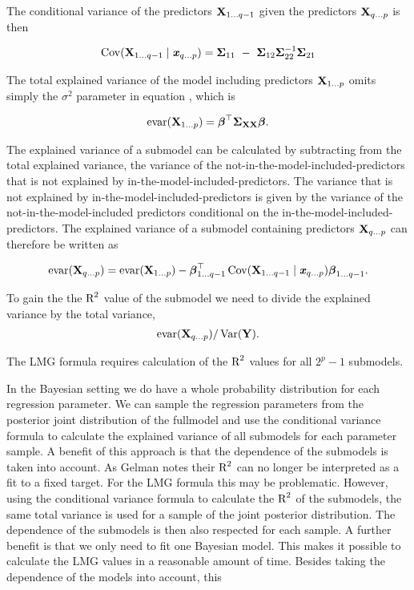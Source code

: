 \documentclass[11pt,a4paper,twoside]{book}
\begin{document}
 The conditional variance of the predictors $ {\mathbf{X}}_{1 \dots q-1} $ given the predictors  $ {\mathbf{X}}_{q \dots p} $ is then
 
          \begin{align} 
 \cov(\X_{1\dots q-1} \mid \x_{q \dots p}) = \bSigma_{11}\ -\ \bSigma_{12} \bSigma_{22}^{-1}\bSigma_{21}
       \end{align}
       
       The total explained variance of the model including predictors ${\mathbf{X}}_{1 \dots p}$ omits simply the $\sigma^2$ parameter in equation , which is

      \begin{align} 
        \text{evar}({\mathbf{X}}_{1 \dots p}) = {\boldsymbol{\beta}}^\top {\boldsymbol{\Sigma}}{}_{{\mathbf{X}} {\mathbf{X}}}  {\boldsymbol{\beta}}. 
   \end{align}

The explained variance of a submodel can be calculated by subtracting from the total explained variance, the variance of the not-in-the-model-included-predictors that is not explained by in-the-model-included-predictors. The variance that is not explained by in-the-model-included-predictors is given by the variance of the not-in-the-model-included predictors conditional on the in-the-model-included-predictors. The explained variance of a submodel containing predictors ${\mathbf{X}}_{q \dots p}$ can therefore be written as

       \begin{align} 
       \text{evar}({\mathbf{X}}_{q \dots p}) =  \text{evar}({\mathbf{X}}_{1  \dots p}) - {\boldsymbol{\beta}}^\top_{1 \dots q-1} \operatorname{Cov}({\mathbf{X}}_{1\dots {q-1}} \mid {\textbf{\textit{x}}}_{q \dots p}) {\boldsymbol{\beta}}_{1 \dots {q-1}}.
   \end{align}

To gain the the $\text{R}^2$ value of the submodel we need to divide the explained variance by the total variance,
       \begin{align} 
\text{evar}({\mathbf{X}}_{q \dots p}) / \operatorname{Var}({\mathbf{Y}}).   
\end{align}

The LMG formula requires calculation of the $\text{R}^2$ values for all $2^p-1$ submodels. 

In the Bayesian setting we do have a whole probability distribution for each regression parameter. We can sample the regression parameters from the posterior joint distribution of the fullmodel and use the conditional variance formula to calculate the explained variance of all submodels for each parameter sample. A benefit of this approach is that the dependence of the submodels is taken into account. As Gelman notes their $\text{R}^2$ can no longer be interpreted as a fit to a fixed target. For the LMG formula this may be problematic. However, using the conditional variance formula to calculate the $\text{R}^2$ of the submodels, the same total variance is used for a sample of the joint posterior distribution. The dependence of the submodels is then also respected for each sample. A further benefit is that we only need to fit one Bayesian model. This makes it possible to calculate the LMG values in a reasonable amount of time. Besides taking the dependence of the models into account, this 
\end{document}
